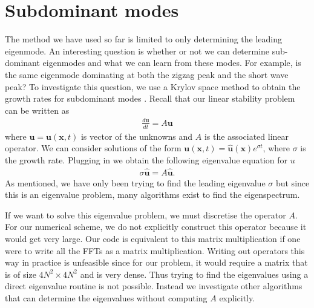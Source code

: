 \section{Subdominant modes}
The method we have used so far is limited to only determining the leading eigenmode. An interesting question is whether or not we can determine sub-dominant eigenmodes and what we can learn from these modes. For example, is the same eigenmode dominating at both the zigzag peak and the short wave peak? To investigate this question, we use a Krylov space method to obtain the growth rates for subdominant modes \cite{edwards1994}. Recall that our linear stability problem can be written as 
\begin{align}
\frac{d\bm{u}}{dt} = A\bm{u}
\end{align}
where $\bm{u}=\bm{u}(\bm{x},t)$ is vector of the unknowns and $A$ is the associated linear operator. We can consider solutions of the form $\bm{u}(\bm{x},t)=\hat{\bm{u}}(\bm{x})e^{\sigma t}$, where $\sigma$ is the growth rate. Plugging in we obtain the following eigenvalue equation for $u$
\begin{align}
\sigma \hat{\bm{u}} = A\hat{\bm{u}}.
\end{align}
As mentioned, we have only been trying to find the leading eigenvalue $\sigma$ but since this is an eigenvalue problem, many algorithms exist to find the eigenspectrum. 

If we want to solve this eigenvalue problem, we must discretise the operator $A$. For our numerical scheme, we do not explicitly construct this operator because it would get very large. Our code is equivalent to this matrix multiplication if one were to write all the FFTs as a matrix multiplication. Writing out operators this way in practice is unfeasible since for our problem, it would require a matrix that is of size $4N^{2}\times 4N^{2}$ and is very dense. Thus trying to find the eigenvalues using a direct eigenvalue routine is not possible. Instead we investigate other algorithms that can determine the eigenvalues without computing $A$ explicitly. 

